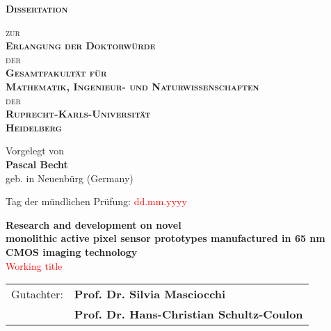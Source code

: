 %
\begin{titlepage}
\begin{center}

{\Huge\textbf{\textsc{Dissertation}}}\\

\vspace{2cm}

\Large\textsc{zur}\\
\textbf{\textsc{Erlangung der Doktorwürde}}\\
\textsc{der} \\
\textbf{\textsc{Gesamtfakultät für}} \\
\textbf{\textsc{Mathematik, Ingenieur- und Naturwissenschaften}} \\
\textsc{der} \\
\textbf{\textsc{Ruprecht-Karls-Universität}} \\
\textbf{\textsc{Heidelberg}} \\

\vfill

\large
Vorgelegt von\\
{\Large\textbf{Pascal Becht}}\\
geb. in Neuenbürg (Germany)\\

\vspace{2cm}

Tag der mündlichen Prüfung: \textcolor{red}{dd.mm.yyyy}

\newpage
\condblankpage

\thispagestyle{empty}
\vspace*{2cm}
\LARGE\textbf{Research and development on novel\\monolithic active pixel sensor prototypes manufactured in 65 nm CMOS imaging technology} \\
\textcolor{red}{Working title}

\vfill

\begin{table}[h]
    \centering
    \begin{tabular}{p{3cm} p{10cm}}
        \large Gutachter: & \large\textbf{Prof. Dr. Silvia Masciocchi} \\ 
                          & \large\textbf{Prof. Dr. Hans-Christian Schultz-Coulon}\\ 
    \end{tabular}
\end{table}

\end{center}

\condblankpage

\end{titlepage}
